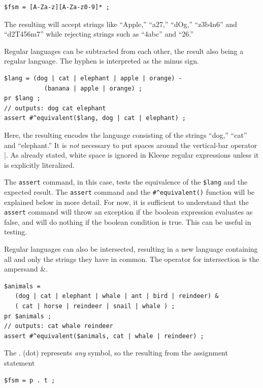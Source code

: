 \begin{Verbatim}
$fsm = [A-Za-z][A-Za-z0-9]* ;
\end{Verbatim}

\noindent
The resulting \fsm{} will accept strings like ``Apple,'' ``a27,'' ``dOg,''
``z3b4n6'' and
``d2T456m7'' while rejecting strings such as ``4abc'' and ``26.''

Regular languages can be subtracted from each other, the result also
being a regular language.  The hyphen is interpreted as the minus sign.

\begin{Verbatim}
$lang = (dog | cat | elephant | apple | orange) - 
           (banana | apple | orange) ;
pr $lang ;
// outputs: dog cat elephant
assert #^equivalent($lang, dog | cat | elephant) ;
\end{Verbatim}

\noindent
Here, the resulting \fsm{} encodes the language consisting of 
the strings ``dog,'' ``cat'' and ``elephant.''
It is \emph{not} necessary to put spaces around the vertical-bar operator |.
As already stated, white space is ignored in Kleene regular expressions
unless it is explicitly literalized.

The \texttt{assert} command, in this case, tests the equivalence
of the \fsm{} \verb!$lang! and the expected result.  The \texttt{assert}
command and the \verb!#^equivalent()! function will be explained below in more detail.
For now, it is sufficient to understand that the \texttt{assert} command will
throw an exception if the boolean expression evaluates as false, and will do nothing if the
boolean condition is true.  This can be useful in testing.

Regular languages can also be intersected, resulting in a new language
containing all and only the strings they have in common.
The operator for intersection is the ampersand \&.

\begin{Verbatim}
$animals = 
   (dog | cat | elephant | whale | ant | bird | reindeer) & 
   ( cat | horse | reindeer | snail | whale ) ; 
pr $animals ;
// outputs: cat whale reindeer
assert #^equivalent($animals, cat | whale | reindeer) ;
\end{Verbatim}

The . (dot) represents \emph{any} symbol, so the \fsm{} resulting from the
assignment statement

\begin{Verbatim}
$fsm = p . t ;
\end{Verbatim}

